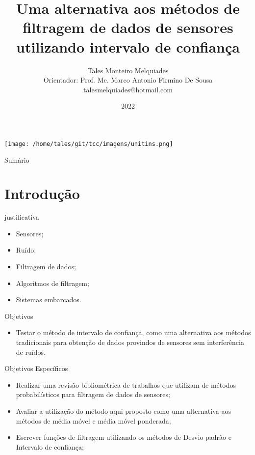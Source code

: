 \documentclass[]{beamer}
\title{Uma alternativa aos métodos de filtragem de dados de sensores utilizando intervalo de confiança}
\author[Tales Monteiro Melquiades]{Tales Monteiro Melquiades \\ Orientador: Prof. Me. Marco Antonio Firmino De Sousa
{\\ \footnotesize\ttfamily talesmelquiades@hotmail.com}}
\institute{%
	Universidade Estadual do Tocantins - UNITINS
	\\
	Curso de Sistemas de Informação
}
\date{2022}
\begin{document}
\begin{frame}

\begin{minipage}{1\linewidth}
  \centering
  \center
  \texttt{[image: /home/tales/git/tcc/imagens/unitins.png]}
 
\end{minipage}

\titlepage

\end{frame}

\begin{frame}{Sumário}
\tableofcontents
\end{frame}

\section{Introdução}
\begin{frame}{justificativa}
	\begin{itemize}
		\item Sensores;
		\item Ruído;
		\item Filtragem de dados;
		\item Algoritmos de filtragem;
		\item Sistemas embarcados.
	\end{itemize}
\end{frame}


\begin{frame}{Objetivos}
	\begin{itemize}
		\item Testar o método de intervalo de confiança, como uma alternativa aos métodos tradicionais para obtenção de dados provindos de sensores sem interferência de ruídos.
	\end{itemize}

\end{frame}

\begin{frame}{Objetivos Específicos}

	\begin{itemize}
		\item Realizar uma revisão bibliométrica de trabalhos que utilizam de métodos probabilísticos para filtragem de dados de sensores;
		\item Avaliar a utilização do método aqui proposto como uma alternativa aos métodos de média móvel e média móvel ponderada;
		\item Escrever funções de filtragem utilizando os métodos de Desvio padrão e Intervalo de confiança;
	\end{itemize}
	
\end{frame}
\end{document}

